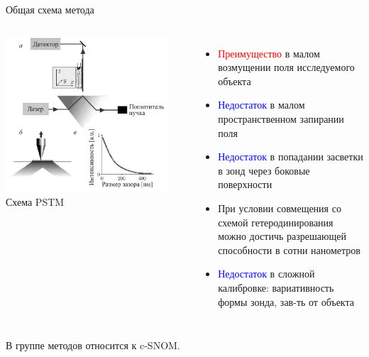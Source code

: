 \documentclass[9pt, compress, xcolor=table]{beamer}
\begin{document}

\begin{frame}{Общая схема метода}

\begin{columns}[c]
\column{6.5cm}
\begin{center}
\includegraphics[width=0.9\textwidth]{nfm17}
\newline Схема PSTM
\end{center}




\column{6cm}
\begin{itemize}
\item \textcolor{red}{Преимущество} в малом возмущении поля исследуемого объекта
\item \textcolor{blue}{Недостаток} в малом пространственном запирании поля
\item \textcolor{blue}{Недостаток} в попадании засветки в зонд через боковые поверхности
\item При условии совмещения со схемой гетеродинирования можно достичь разрешающей способности в сотни нанометров
\item \textcolor{blue}{Недостаток} в сложной калибровке: вариативность формы зонда, зав-ть от объекта
\end{itemize}
\end{columns}
В группе методов относится к c-SNOM.

\end{frame}
\end{document}
